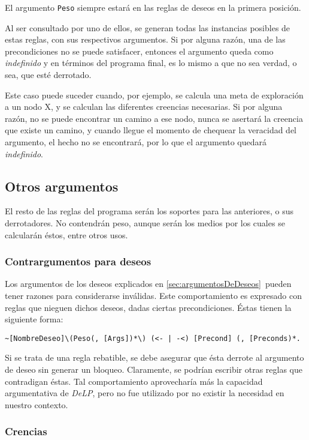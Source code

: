 \documentclass[oneside]{book}
\begin{document}
El argumento \texttt{Peso} siempre estará en las reglas de deseos en la primera posición.

Al ser consultado por uno de ellos, se generan todas las instancias posibles de estas
reglas, con sus respectivos argumentos. Si por alguna razón, una de las precondiciones no
se puede satisfacer, entonces el argumento queda como \textit{indefinido} %
y en términos del programa final, es lo mismo a que no sea verdad, o sea, que esté 
derrotado. 

Este caso puede suceder cuando, por ejemplo, se calcula una meta de 
exploración a un nodo X, y se calculan las diferentes creencias necesarias. Si por 
alguna razón, no se puede encontrar un camino a ese nodo, nunca se asertará la creencia
que existe un camino, y cuando llegue el momento de chequear la veracidad del argumento,
el hecho no se encontrará, por lo que el argumento quedará \textit{indefinido}. 

\subsection{Otros argumentos}

El resto de las reglas del programa serán los soportes para las anteriores, 
o sus derrotadores. No 
contendrán peso, aunque serán los medios por los cuales se calcularán éstos, entre
otros usos.

\subsubsection{Contrargumentos para deseos}

Los argumentos de los deseos explicados en \ref{sec:argumentosDeDeseos}\ pueden tener
razones para considerarse inválidas. Este comportamiento es expresado con reglas que 
nieguen dichos deseos, dadas ciertas precondiciones. Éstas tienen la siguiente forma:

\begin{verbatim}
~[NombreDeseo]\(Peso(, [Args])*\) (<- | -<) [Precond] (, [Preconds)*.
\end{verbatim}

Si se trata de una regla rebatible, se debe asegurar que ésta derrote al argumento
de deseo sin generar un bloqueo. Claramente, se podrían escribir otras reglas que
contradigan éstas. Tal comportamiento aprovecharía más la capacidad argumentativa 
de \textit{DeLP}, pero no fue utilizado por no existir la necesidad
en nuestro contexto.

\subsubsection{Crencias}
\end{document}

